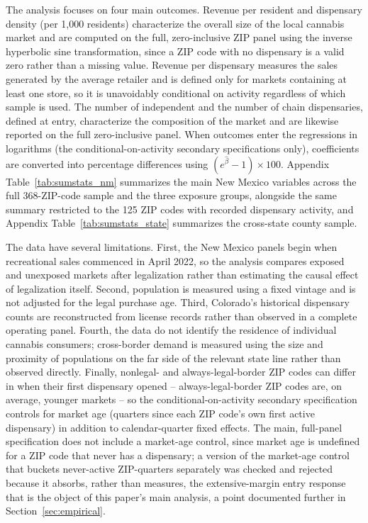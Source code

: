 \documentclass[english,12pt]{article}
\begin{document}
The analysis focuses on four main outcomes. Revenue per resident and dispensary density (per 1,000 residents) characterize the overall size of the local cannabis market and are computed on the full, zero-inclusive ZIP panel using the inverse hyperbolic sine transformation, since a ZIP code with no dispensary is a valid zero rather than a missing value. Revenue per dispensary measures the sales generated by the average retailer and is defined only for markets containing at least one store, so it is unavoidably conditional on activity regardless of which sample is used. The number of independent and the number of chain dispensaries, defined at entry, characterize the composition of the market and are likewise reported on the full zero-inclusive panel. When outcomes enter the regressions in logarithms (the conditional-on-activity secondary specifications only), coefficients are converted into percentage differences using $(e^{\hat\beta}-1)\times100$. Appendix Table~\ref{tab:sumstats_nm} summarizes the main New Mexico variables across the full 368-ZIP-code sample and the three exposure groups, alongside the same summary restricted to the 125 ZIP codes with recorded dispensary activity, and Appendix Table~\ref{tab:sumstats_state} summarizes the cross-state county sample.

The data have several limitations. First, the New Mexico panels begin when recreational sales commenced in April 2022, so the analysis compares exposed and unexposed markets after legalization rather than estimating the causal effect of legalization itself. Second, population is measured using a fixed vintage and is not adjusted for the legal purchase age. Third, Colorado's historical dispensary counts are reconstructed from license records rather than observed in a complete operating panel. Fourth, the data do not identify the residence of individual cannabis consumers; cross-border demand is measured using the size and proximity of populations on the far side of the relevant state line rather than observed directly. Finally, nonlegal- and always-legal-border ZIP codes can differ in when their first dispensary opened -- always-legal-border ZIP codes are, on average, younger markets -- so the conditional-on-activity secondary specification controls for market age (quarters since each ZIP code's own first active dispensary) in addition to calendar-quarter fixed effects. The main, full-panel specification does not include a market-age control, since market age is undefined for a ZIP code that never has a dispensary; a version of the market-age control that buckets never-active ZIP-quarters separately was checked and rejected because it absorbs, rather than measures, the extensive-margin entry response that is the object of this paper's main analysis, a point documented further in Section~\ref{sec:empirical}.
\end{document}
